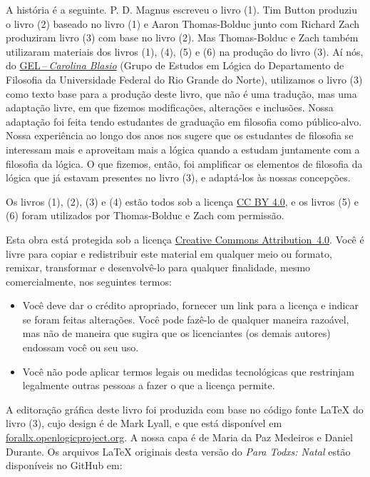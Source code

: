 \noindent A história é a seguinte.
P. D. Magnus escreveu o livro (1). Tim Button produziu o livro (2) baseado no livro (1) e Aaron Thomas-Bolduc junto com Richard Zach produziram  livro (3) com base no livro (2).
Mas Thomas-Bolduc e Zach também utilizaram materiais dos livros (1), (4), (5) e (6) na produção do livro (3).
Aí nós, do \href{https://gelogica.weebly.com/}{GEL\,--\,\textit{Carolina Blasio}} (Grupo de Estudos em Lógica do Departamento de Filosofia da Universidade Federal do Rio Grande do Norte), 
utilizamos o livro (3) como texto base para a produção deste livro, que não é uma tradução, mas uma adaptação livre, em que fizemos modificações, alterações e inclusões.
Nossa adaptação foi feita tendo estudantes de graduação em filosofia como público-alvo.
Nossa experiência ao longo dos anos nos sugere que  os estudantes de filosofia se interessam mais e aproveitam mais a lógica quando a estudam juntamente com a filosofia da lógica.
O que fizemos, então, foi amplificar os elementos de filosofia da lógica que já estavam presentes no livro (3), e adaptá-los às nossas concepções.

Os livros (1), (2), (3) e (4) estão todos sob a licença \href{https://creativecommons.org/licenses/by/4.0/}{CC BY 4.0}, e os livros (5) e (6) foram utilizados por Thomas-Bolduc e Zach com permissão.\label{cc4by}




Esta obra está protegida sob a licença \href{https://creativecommons.org/licenses/by/4.0/}{Creative Commons \hbox{Attribution 4.0}}. 
Você é livre para copiar e redistribuir este material em qualquer meio ou formato, remixar, transformar e desenvolvê-lo para qualquer finalidade, mesmo comercialmente, nos seguintes termos:
\begin{itemize}
\item Você deve dar o crédito apropriado, fornecer um link para a licença e indicar se foram feitas alterações. Você pode fazê-lo de qualquer maneira razoável, mas não de maneira que sugira que os licenciantes (os demais autores) endossam você ou seu uso.
\item Você não pode aplicar termos legais ou medidas tecnológicas que restrinjam legalmente outras pessoas a fazer o que a licença permite.
\end{itemize}

\noindent A editoração gráfica deste livro foi produzida com base no código fonte \LaTeX{} do livro (3), cujo design é de Mark Lyall, e que está disponível em \hbox{\href{https://forallx.openlogicproject.org}{forallx.openlogicproject.org}}.
A nossa capa é de Maria da Paz Medeiros e Daniel Durante.
Os arquivos  \LaTeX{} originais desta versão do \textit{Para Todxs: Natal} estão disponíveis no GitHub em:

